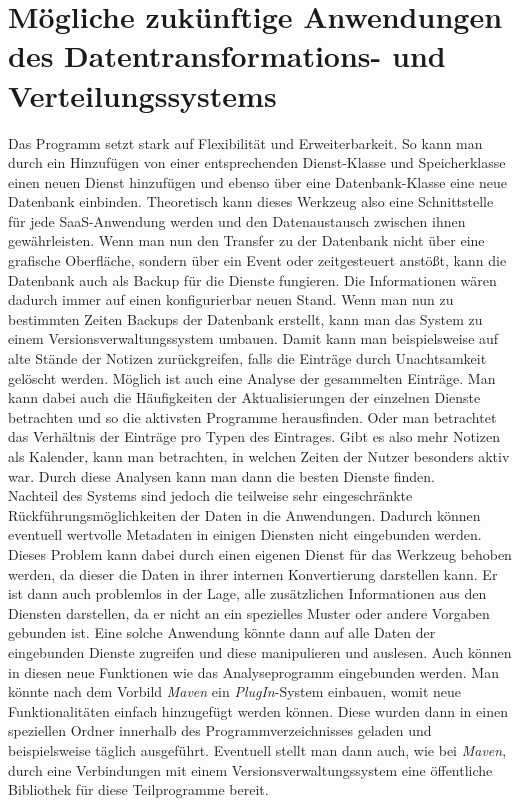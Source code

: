 \chapter{Mögliche zukünftige Anwendungen des Datentransformations- und Verteilungssystems}

Das Programm setzt stark auf Flexibilität und Erweiterbarkeit. So kann man durch ein Hinzufügen von einer entsprechenden Dienst-Klasse und Speicherklasse einen neuen Dienst hinzufügen und ebenso über eine Datenbank-Klasse eine neue Datenbank einbinden. Theoretisch kann dieses Werkzeug also eine Schnittstelle für jede SaaS-Anwendung werden und den Datenaustausch zwischen ihnen gewährleisten. Wenn man nun den Transfer zu der Datenbank nicht über eine grafische Oberfläche, sondern über ein Event oder zeitgesteuert anstößt, kann die Datenbank auch als Backup für die Dienste fungieren. Die Informationen wären dadurch immer auf einen konfigurierbar neuen Stand. Wenn man nun zu bestimmten Zeiten Backups der Datenbank erstellt, kann man das System zu einem Versionsverwaltungssystem umbauen. Damit kann man beispielsweise auf alte Stände der Notizen zurückgreifen, falls die Einträge durch Unachtsamkeit gelöscht werden. 
Möglich ist auch eine Analyse der gesammelten Einträge. Man kann dabei auch die Häufigkeiten der Aktualisierungen der einzelnen Dienste betrachten und so die aktivsten Programme herausfinden. Oder man betrachtet das Verhältnis der Einträge pro Typen des Eintrages. Gibt es also mehr Notizen als Kalender, kann man betrachten, in welchen Zeiten der Nutzer besonders aktiv war. Durch diese Analysen kann man dann die besten Dienste finden. \\
Nachteil des Systems sind jedoch die teilweise sehr eingeschränkte Rückführungsmöglichkeiten der Daten in die Anwendungen. Dadurch können eventuell wertvolle Metadaten in einigen Diensten nicht eingebunden werden. Dieses Problem kann dabei durch einen eigenen Dienst für das Werkzeug behoben werden, da dieser die Daten in ihrer internen Konvertierung darstellen kann. Er ist dann auch problemlos in der Lage, alle zusätzlichen Informationen aus den Diensten darstellen, da er nicht an ein spezielles Muster oder andere Vorgaben gebunden ist. Eine solche Anwendung könnte dann auf alle Daten der eingebunden Dienste zugreifen und diese manipulieren und auslesen. Auch können in diesen neue Funktionen wie das Analyseprogramm eingebunden werden. Man könnte nach dem Vorbild \textit{Maven} ein \textit{PlugIn}-System einbauen, womit neue Funktionalitäten einfach hinzugefügt werden können. Diese wurden dann in einen speziellen Ordner innerhalb des Programmverzeichnisses geladen und beispielsweise täglich ausgeführt. Eventuell stellt man dann auch, wie bei \textit{Maven}, durch eine Verbindungen mit einem Versionsverwaltungssystem eine öffentliche Bibliothek für diese Teilprogramme bereit.\\